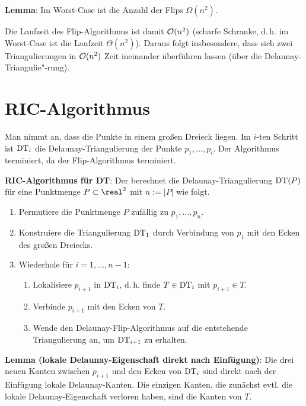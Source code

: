\textbf{Lemma}:
Im Worst-Case ist die Anzahl der Flips $\Omega(n^2)$.

\linie

Die Laufzeit des Flip-Algorithmus ist damit $\mathcal{O}(n^2)$
(scharfe Schranke, d.\,h. im Worst-Case ist die Laufzeit $\Theta(n^2)$).
Daraus folgt insbesondere, dass sich zwei Triangulierungen in $\mathcal{O}(n^2)$ Zeit ineinander
überführen lassen (über die Delaunay-Triangulie"-rung).

\pagebreak

\section{%
    RIC-Algorithmus%
}

Man nimmt an, dass die Punkte in einem großen Dreieck liegen.
Im $i$-ten Schritt ist $\operatorname{DT}_i$
die Delaunay-Triangulierung der Punkte $p_1, \dotsc, p_i$.
Der Algorithmus terminiert, da der Flip-Algorithmus terminiert.

\textbf{RIC-Algorithmus für DT}:
Der  berechnet die Delaunay-Triangulierung $\operatorname{DT}(P)$
für eine Punktmenge $P \subset \real^2$ mit $n := |P|$ wie folgt.
\begin{enumerate}
    \item
    Permutiere die Punktmenge $P$ zufällig zu $p_1, \dotsc, p_n$.

    \item
    Konstruiere die Triangulierung $\operatorname{DT}_1$ durch Verbindung von $p_1$ mit den Ecken des
    großen Dreiecks.

    \item
    Wiederhole für $i = 1, \dotsc, n - 1$:
    \begin{enumerate}
        \item
        Lokalisiere $p_{i+1}$ in $\operatorname{DT}_i$, d.\,h. finde $T \in \operatorname{DT}_i$ mit $p_{i+1} \in T$.

        \item
        Verbinde $p_{i+1}$ mit den Ecken von $T$.

        \item
        Wende den Delaunay-Flip-Algorithmus auf die entstehende Triangulierung an,
        um $\operatorname{DT}_{i+1}$ zu erhalten.
    \end{enumerate}
\end{enumerate}

\linie

\textbf{Lemma (lokale Delaunay-Eigenschaft direkt nach Einfügung)}:
Die drei neuen Kanten zwischen $p_{i+1}$ und den Ecken von $\operatorname{DT}_i$
sind direkt nach der Einfügung lokale Delaunay-Kanten.
Die einzigen Kanten, die zunächst evtl. die lokale Delaunay-Eigenschaft verloren haben,
sind die Kanten von $T$.

